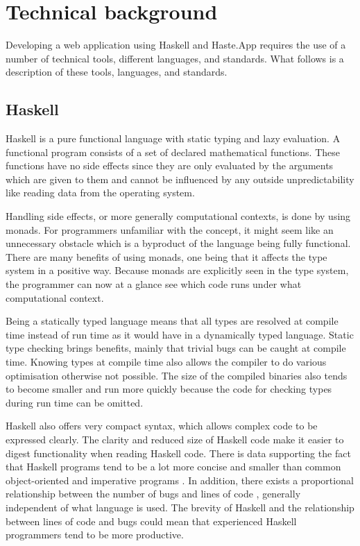 \documentclass[a4paper]{article}
\begin{document}
\section{Technical background}
Developing a web application using Haskell and Haste.App requires the use of a number of technical tools, different languages, and standards. What follows is a description of these tools, languages, and standards.


\subsection{Haskell}
Haskell is a pure functional language with static typing and lazy evaluation. A functional program consists of a set of declared mathematical functions. These functions have no side effects since they are only evaluated by the arguments which are given to them and cannot be influenced by any outside unpredictability like reading data from the operating system.

Handling side effects, or more generally computational contexts, is done by using monads. For programmers unfamiliar with the concept, it might seem like an unnecessary obstacle which is a byproduct of the language being fully functional. There are many benefits of using monads, one being that it affects the type system in a positive way. Because monads are explicitly seen in the type system, the programmer can now at a glance see which code runs under what computational context. %

Being a statically typed language means that all types are resolved at compile time instead of run time as it would have in a dynamically typed language. Static type checking brings benefits, mainly that trivial bugs can be caught at compile time. Knowing types at compile time also allows the compiler to do various optimisation otherwise not possible. The size of the compiled binaries also tends to become smaller and run more quickly because the code for checking types during run time can be omitted.

Haskell also offers very compact syntax, which allows complex code to be expressed clearly. The clarity and reduced size of Haskell code make it easier to digest functionality when reading Haskell code. There is data supporting the fact that Haskell programs tend to be a lot more concise and smaller than common object-oriented and imperative programs \cite{hudak1994haskell}. In addition, there exists a proportional relationship between the number of bugs and lines of code \cite{mcconnell2004code}, generally independent of what language is used. The brevity of Haskell and the relationship between lines of code and bugs could mean that experienced Haskell programmers tend to be more productive.
\end{document}
